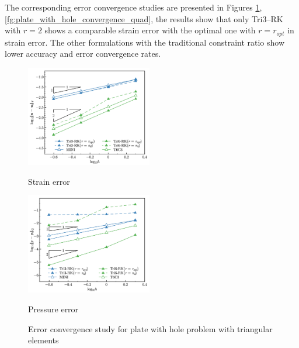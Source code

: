 The corresponding error convergence studies are presented in Figures \ref{fg:plate_with_hole_convergence}, \ref{fg:plate_with_hole_convergence_quad}, the results show that only Tri3--RK with $r=2$ shows a comparable strain error with the optimal one with $r=r_{opt}$ in strain error. The other formulations with the traditional constraint ratio show lower accuracy and error convergence rates.

\begin{figure}[!htp]
\centering
\begin{subcaptiongroup}
\centering
\parbox[b]{0.49\textwidth}{
    \includegraphics[width=0.49\textwidth]{plate_with_hole_Hdev_r1.png}
    \caption{Strain error}\label{fg:plate_with_hole_convergence_strain}
}
\parbox[b]{0.49\textwidth}{
    \includegraphics[width=0.49\textwidth]{plate_with_hole_L2_p_r1.png}
    \caption{Pressure error}\label{fg:plate_with_hole_convergence_pressure}
}
\end{subcaptiongroup}
\caption{Error convergence study for plate with hole problem with triangular elements}\label{fg:plate_with_hole_convergence}
\end{figure}

